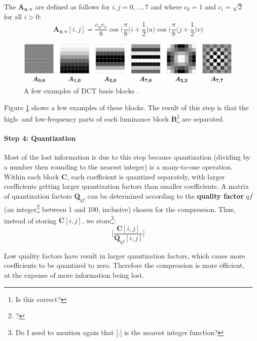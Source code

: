 \documentclass[11pt,a4paper,twoside,openright]{report}
\begin{document}
The $\bm{A_{u,v}}$ are defined as follows for $i,j = 0,...,7$ and where $c_0=1$ and $c_i=\sqrt{2}$ for all $i > 0$:
\begin{equation*}
    \bm{A_{u,v}}[i,j] = \frac{c_u c_v}{8} \cos{\Bigg(\frac{\pi}{8}\Big(i + \frac{1}{2}\Big)u\Bigg)} \cos{\Bigg(\frac{\pi}{8}\Big(j + \frac{1}{2}\Big)v\Bigg)}
\end{equation*}

\begin{figure}[htbp] 
	\begin{center}
		\includegraphics[width=0.75\linewidth]{dct_basis_examples.png}
		\caption{A few examples of DCT basis blocks \cite{ker-notes}.}
		\label{fig:dct-basis-examples}
	\end{center}
\end{figure}

Figure \ref{fig:dct-basis-examples} shows a few examples of these blocks. The result of this step is that the high- and low-frequency parts of each luminance block $\bm{B}$\footnote{Is this correct?} are separated.

\paragraph{Step 4: Quantization} Most of the lost information is due to this step because quantization (dividing by a number then rounding to the nearest integer) is a many-to-one operation. Within each block $\bm{C}$, each coefficient is quantized separately, with larger coefficients getting larger quantization factors than smaller coefficients. A matrix of quantization factors $\bm{Q}_{qf}$ can be determined according to the \textbf{quality factor} $qf$ (an integer\footnote{?} between 1 and 100, inclusive) chosen for the compression. Thus, instead of storing $\bm{C}[i,j]$, we store\footnote{Do I need to mention again that [.] is the nearest integer function?}:
\begin{equation*}
	\Bigg[ \frac{\bm{C}[i,j]}{\bm{Q}_{qf}[i,j]} \Bigg]
\end{equation*}

Low quality factors have result in larger quantization factors, which cause more coefficients to be quantized to zero. Therefore the compression is more efficient, at the expense of more information being lost.
\end{document}
